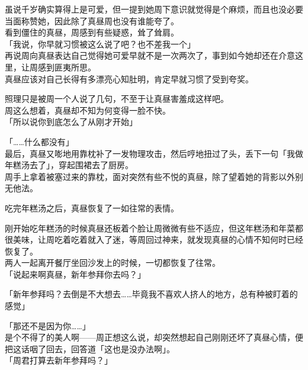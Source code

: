 虽说千岁确实算得上是可爱，但一提到她周下意识就觉得是个麻烦，而且也没必要当面称赞她，因此除了真昼周也没有谁能夸了。\\

看到僵住的真昼，周感到有些疑惑，耸了耸肩。\\

「我说，你早就习惯被这么说了吧？也不差我一个」\\

再说周向真昼表达自己觉得她可爱早就不是一次两次了，事到如今她却还在介意这里，让周感到匪夷所思。\\

真昼应该对自己长得有多漂亮心知肚明，肯定早就习惯了受到夸奖。

照理只是被周一个人说了几句，不至于让真昼害羞成这样吧。\\

周这么想着，真昼却不知为何变得一脸不快。\\

「所以说你到底怎么了从刚才开始」

「……什么都没有」\\

最后，真昼又嘭地用靠枕补了一发物理攻击，然后哼地扭过了头，丢下一句「我做年糕汤去了」，穿起围裙去了厨房。\\

周手上拿着被塞过来的靠枕，面对突然有些不悦的真昼，除了望着她的背影以外别无他法。\\

\vspace{2\baselineskip}

吃完年糕汤之后，真昼恢复了一如往常的表情。

刚开始吃年糕汤的时候真昼还板着个脸让周微微有些不适应，但这年糕汤和年菜都很美味，让周吃着吃着就入了迷，等周回过神来，就发现真昼的心情不知何时已经恢复了。\\

两人一起离开餐厅坐回沙发上的时候，一切都恢复了往常。\\

「说起来啊真昼，新年参拜你去吗？」

「新年参拜吗？去倒是不大想去……毕竟我不喜欢人挤人的地方，总有种被盯着的感觉」

「那还不是因为你……」\\

是个不得了的美人啊——周正想这么说，却突然想起自己刚刚还坏了真昼心情，便把这话咽了回去，回答道「这也是没办法啊」。\\

「周君打算去新年参拜吗？」


